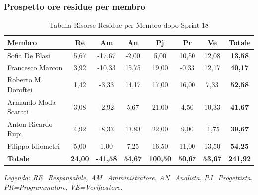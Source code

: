 \subsubsection{Prospetto ore residue per membro}
\begin{table}[H]
    \centering
    \renewcommand{\arraystretch}{1.3}
    \begin{tabularx}{\textwidth}{|X|c|c|c|c|c|c|c|}
        \hline
        \textbf{Membro} & \textbf{Re} & \textbf{Am} & \textbf{An} &
        \textbf{Pj} & \textbf{Pr} & \textbf{Ve} & \textbf{Totale} \\
        \hline
        Sofia De Blasi       &  5,67 & -17,67 &  -2,00 &  5,00 & 10,50 & 12,08 & \textbf{13,58} \\
        Francesco Marcon     &  3,92 & -10,33 &  15,75 & 19,00 & -0,33 & 12,17 & \textbf{40,17} \\
        Roberto M. Doroftei  &  1,42 &  -3,33 &  14,17 & 17,00 & 16,00 &  7,33 & \textbf{52,58} \\
        Armando Moda Scarati &  3,08 &  -2,92 &   5,67 & 21,00 &  4,50 & 10,33 & \textbf{41,67} \\
        Anton Ricardo Rupi   &  4,92 &  -8,33 &  13,83 & 22,00 &  9,00 & -1,75 & \textbf{39,67} \\
        Filippo Idiometri    &  5,00 &   1,00 &   7,25 & 16,50 & 11,00 & 13,50 & \textbf{54,25} \\
        \hline
        \textbf{Totale} &
        \textbf{24,00} & \textbf{-41,58} & \textbf{54,67} &
        \textbf{100,50} & \textbf{50,67} & \textbf{53,67} &
        \textbf{241,92} \\
        \hline
    \end{tabularx}
    \begin{minipage}{\textwidth}
        \smallskip
        \footnotesize\textit{Legenda: RE=Responsabile, AM=Amministratore,
        AN=Analista, PJ=Progettista, PR=Programmatore, VE=Verificatore.}
    \end{minipage}
    \caption{Tabella Risorse Residue per Membro dopo Sprint 18}
\end{table}

